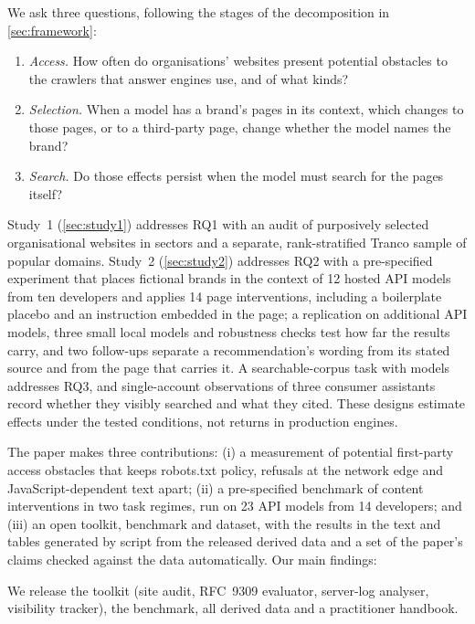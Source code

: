 \documentclass[11pt]{article}
\begin{document}
We ask three questions, following the stages of the decomposition in \cref{sec:framework}:
\begin{enumerate}[label=\textbf{RQ\arabic*.},leftmargin=*]
  \item \emph{Access.} How often do organisations' websites present potential obstacles to the crawlers that answer
  engines use, and of what kinds?
  \item \emph{Selection.} When a model has a brand's pages in its context, which changes to those pages, or to a
  third-party page, change whether the model names the brand?
  \item \emph{Search.} Do those effects persist when the model must search for the pages itself?
\end{enumerate}
Study~1 (\cref{sec:study1}) addresses RQ1 with an audit of \NSites{} purposively selected organisational websites in
\NSectors{} sectors and a separate, rank-stratified Tranco sample of \RandSites{} popular domains. Study~2
(\cref{sec:study2}) addresses RQ2 with a pre-specified experiment that places fictional brands in the context of 12
hosted API models from ten developers and applies 14 page interventions, including a boilerplate placebo and an
instruction embedded in the page; a replication on \FlNModelsTwo{} additional API models, three small local models and
robustness checks test how far the results carry, and two follow-ups separate a recommendation's wording from its
stated source and from the page that carries it. A searchable-corpus task with \AgNModelsW{} models addresses RQ3,
and single-account observations of three consumer assistants record whether they visibly searched and what they
cited. These designs estimate effects under the tested conditions, not returns in production engines.

The paper makes three contributions: (i) a measurement of potential first-party access obstacles that keeps robots.txt
policy, refusals at the network edge and JavaScript-dependent text apart; (ii) a pre-specified benchmark of content interventions in two
task regimes, run on 23 API models from 14 developers; and (iii) an open toolkit, benchmark and dataset, with the results in the text
and tables generated by script from the released derived data and a set of the paper's claims checked against the data
automatically. Our main findings:



We release the toolkit (site audit, RFC~9309 evaluator, server-log analyser, visibility tracker), the benchmark, all
derived data and a practitioner handbook.
\end{document}
